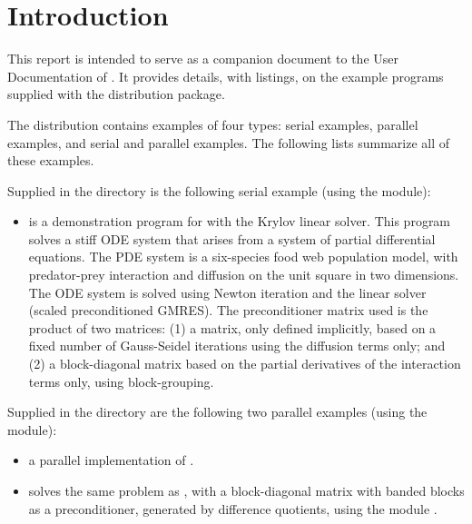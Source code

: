 \section{Introduction}\label{s:ex_intro}

This report is intended to serve as a companion document to the User
Documentation of {\kinsol} \cite{kinsol2.2.0_ug}.  It provides details, with
listings, on the example programs supplied with the {\kinsol} distribution
package.

The {\kinsol} distribution contains examples of four types: serial
{\C} examples, parallel {\C} examples, and serial and parallel {\F}
examples.  The following lists summarize all of these examples.

Supplied in the  directory is the
following serial example (using the {\nvecs} module):

\begin{itemize}
\item {}
  is a demonstration program for {\kinsol} with the Krylov linear solver.
  \newline
  This program solves a stiff ODE system that arises from a system
  of partial differential equations.  The PDE system is a six-species
  food web population model, with predator-prey interaction and diffusion
  on the unit square in two dimensions.
  \newline
  The ODE system is solved using Newton iteration and the
  {\kinspgmr} linear solver (scaled preconditioned GMRES).
  \newline
  The preconditioner matrix used is the product of two matrices:
  (1) a matrix, only defined implicitly, based on a fixed number of
  Gauss-Seidel iterations using the diffusion terms only; and
  (2) a block-diagonal matrix based on the partial derivatives of the
  interaction terms only, using block-grouping.
\end{itemize}

Supplied in the  directory are
the following two parallel examples (using the {\nvecp} module):
\begin{itemize}
\item {}
  a parallel implementation of .
\item {}
  solves the same problem as , with a block-diagonal matrix
  with banded blocks as a preconditioner, generated by difference quotients,
  using the module {\kinbbdpre}.
\end{itemize}

